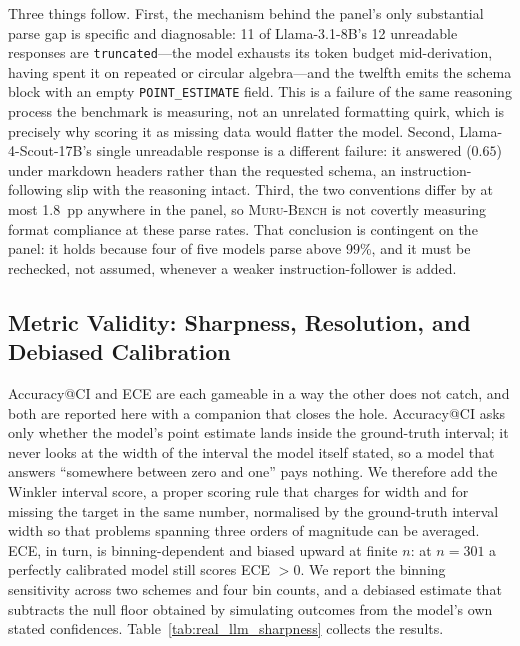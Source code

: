 \documentclass{article}
\newcommand{\muru}{\textsc{Muru-Bench}}
\begin{document}
Three things follow. First, the mechanism behind the panel's only substantial parse gap is specific and diagnosable: 11 of Llama-3.1-8B's 12 unreadable responses are \texttt{truncated}---the model exhausts its token budget mid-derivation, having spent it on repeated or circular algebra---and the twelfth emits the schema block with an empty \texttt{POINT\_ESTIMATE} field. This is a failure of the same reasoning process the benchmark is measuring, not an unrelated formatting quirk, which is precisely why scoring it as missing data would flatter the model. Second, Llama-4-Scout-17B's single unreadable response is a different failure: it answered ($0.65$) under markdown headers rather than the requested schema, an instruction-following slip with the reasoning intact. Third, the two conventions differ by at most 1.8~pp anywhere in the panel, so \muru{} is not covertly measuring format compliance at these parse rates. That conclusion is contingent on the panel: it holds because four of five models parse above 99\%, and it must be rechecked, not assumed, whenever a weaker instruction-follower is added.

\subsection{Metric Validity: Sharpness, Resolution, and Debiased Calibration}
\label{sec:real_llm_metrics}

Accuracy@CI and ECE are each gameable in a way the other does not catch, and both are reported here with a companion that closes the hole. Accuracy@CI asks only whether the model's point estimate lands inside the ground-truth interval; it never looks at the width of the interval the model itself stated, so a model that answers ``somewhere between zero and one'' pays nothing. We therefore add the Winkler interval score, a proper scoring rule that charges for width and for missing the target in the same number, normalised by the ground-truth interval width so that problems spanning three orders of magnitude can be averaged. ECE, in turn, is binning-dependent and biased upward at finite $n$: at $n = 301$ a perfectly calibrated model still scores ECE $> 0$. We report the binning sensitivity across two schemes and four bin counts, and a debiased estimate that subtracts the null floor obtained by simulating outcomes from the model's own stated confidences. Table~\ref{tab:real_llm_sharpness} collects the results.
\end{document}
